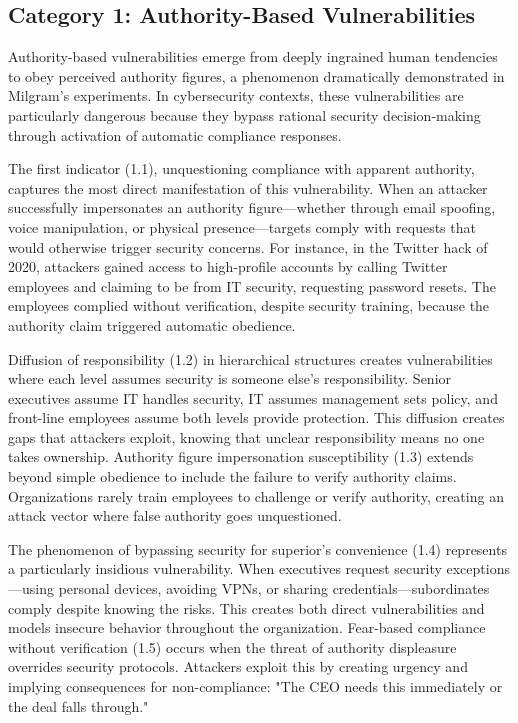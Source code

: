 \documentclass[manuscript,screen,review]{acmart}
\begin{document}
\subsection{Category 1: Authority-Based Vulnerabilities}

Authority-based vulnerabilities emerge from deeply ingrained human tendencies to obey perceived authority figures, a phenomenon dramatically demonstrated in Milgram's experiments\cite{milgram1974}. In cybersecurity contexts, these vulnerabilities are particularly dangerous because they bypass rational security decision-making through activation of automatic compliance responses.

The first indicator (1.1), unquestioning compliance with apparent authority, captures the most direct manifestation of this vulnerability. When an attacker successfully impersonates an authority figure—whether through email spoofing, voice manipulation, or physical presence—targets comply with requests that would otherwise trigger security concerns. For instance, in the Twitter hack of 2020, attackers gained access to high-profile accounts by calling Twitter employees and claiming to be from IT security, requesting password resets. The employees complied without verification, despite security training, because the authority claim triggered automatic obedience.

Diffusion of responsibility (1.2) in hierarchical structures creates vulnerabilities where each level assumes security is someone else's responsibility. Senior executives assume IT handles security, IT assumes management sets policy, and front-line employees assume both levels provide protection. This diffusion creates gaps that attackers exploit, knowing that unclear responsibility means no one takes ownership. Authority figure impersonation susceptibility (1.3) extends beyond simple obedience to include the failure to verify authority claims. Organizations rarely train employees to challenge or verify authority, creating an attack vector where false authority goes unquestioned.

The phenomenon of bypassing security for superior's convenience (1.4) represents a particularly insidious vulnerability. When executives request security exceptions—using personal devices, avoiding VPNs, or sharing credentials—subordinates comply despite knowing the risks. This creates both direct vulnerabilities and models insecure behavior throughout the organization. Fear-based compliance without verification (1.5) occurs when the threat of authority displeasure overrides security protocols. Attackers exploit this by creating urgency and implying consequences for non-compliance: "The CEO needs this immediately or the deal falls through."
\end{document}
